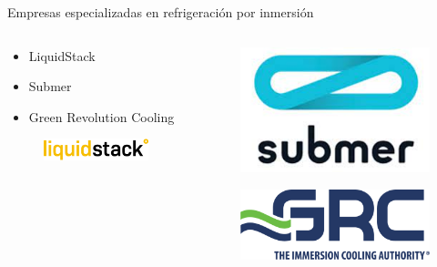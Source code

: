 \documentclass[aspectratio=169, compress]{beamer}
\begin{document}
\begin{frame}{Empresas especializadas en refrigeración por inmersión}
    \begin{columns}
        \begin{column}{0.5\textwidth}
           
            \begin{itemize}
                \item LiquidStack
                \item Submer
                \item Green Revolution Cooling
            \end{itemize}
        
            \begin{figure}
                \begin{center}
                    \includegraphics[scale=0.5]{./figures/liquidstack}
                \end{center}
            \end{figure}
            
        \end{column}
        \begin{column}{0.5\textwidth}  
            
            \begin{figure}
                \begin{center}
                    \includegraphics[scale=0.35]{./figures/submer}
                \end{center}
            \end{figure}
        
            \begin{figure}
                \begin{center}
                    \includegraphics[scale=0.35]{./figures/grc}
                \end{center}
            \end{figure}
        
        \end{column}
    \end{columns}
\end{frame}
\end{document}

